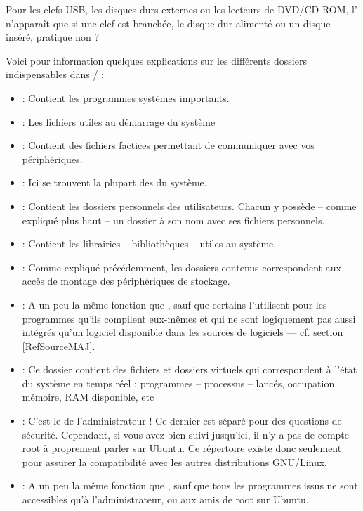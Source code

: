 \begin{nota}
Pour les clefs USB, les disques durs externes ou les lecteurs de DVD/CD-ROM, l' n'apparaît que si une clef est branchée, le disque dur alimenté ou un disque inséré, pratique non ?
\end{nota}
Voici pour information quelques explications sur les différents dossiers indispensables dans / :
\begin{itemize}
\item {} : Contient les programmes systèmes importants.
\item {} : Les fichiers utiles au démarrage du système
\item {} : Contient des fichiers factices permettant de communiquer avec vos périphériques.
\item {} : Ici se trouvent la plupart des  du système.
\item {} : Contient les dossiers personnels des utilisateurs. Chacun y possède -- comme expliqué plus haut -- un dossier à son nom avec ses fichiers personnels.
\item {} : Contient les librairies -- bibliothèques -- utiles au système.
\item {} : Comme expliqué précédemment, les dossiers contenus correspondent aux accès de montage des périphériques de stockage.
\item {} : A un peu la même fonction que , sauf que certains l'utilisent pour les programmes qu'ils compilent eux-mêmes et qui ne sont logiquement pas aussi intégrés qu'un logiciel disponible dans les sources de logiciels --- cf. section \ref{RefSourceMAJ}.
\item {} : Ce dossier contient des fichiers et dossiers virtuels qui correspondent à l'état du système en temps réel : programmes -- processus -- lancés, occupation mémoire, RAM disponible, etc
\item {} : C'est le  de l'administrateur ! Ce dernier est séparé pour des questions de sécurité. Cependant, si vous avez bien suivi jusqu'ici, il n'y a pas de compte root à proprement parler sur Ubuntu. Ce répertoire existe donc seulement pour assurer la compatibilité avec les autres distributions GNU/Linux.
\item {} : A un peu la même fonction que , sauf que tous les programmes issus ne sont accessibles qu'à l'administrateur, ou aux amis de root sur Ubuntu.

\end{itemize}
